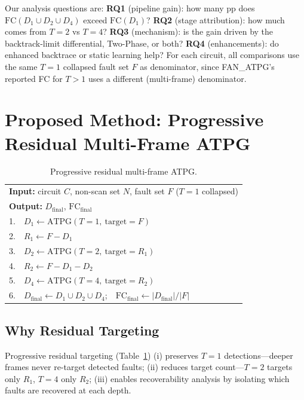 \documentclass[conference]{IEEEtran}
\begin{document}
Our analysis questions are: \textbf{RQ1} (pipeline gain): how many pp does
$\mathrm{FC}(D_1{\cup}D_2{\cup}D_4)$ exceed $\mathrm{FC}(D_1)$? \textbf{RQ2}
(stage attribution): how much comes from $T{=}2$ vs $T{=}4$? \textbf{RQ3}
(mechanism): is the gain driven by the backtrack-limit differential, Two-Phase, or both?
\textbf{RQ4} (enhancements): do enhanced backtrace or static learning help? For
each circuit, all comparisons use the same $T{=}1$ collapsed fault set $F$ as
denominator, since FAN\_ATPG's reported FC for $T{>}1$ uses a different
(multi-frame) denominator.

\section{Proposed Method: Progressive Residual Multi-Frame ATPG}
\label{sec:method}

\begin{table}[t]
\caption{Progressive residual multi-frame ATPG.}
\label{tab:algo}
\centering
\footnotesize
\begin{tabular}{@{}l@{}}
\toprule
\textbf{Input:} circuit $C$, non-scan set $N$, fault set $F$ ($T{=}1$ collapsed)\\
\textbf{Output:} $D_{\text{final}}$, $\mathrm{FC}_{\text{final}}$\\
\midrule
1.\ \ $D_1 \leftarrow \mathrm{ATPG}(T{=}1,\ \text{target}{=}F)$\\
2.\ \ $R_1 \leftarrow F - D_1$\\
3.\ \ $D_2 \leftarrow \mathrm{ATPG}(T{=}2,\ \text{target}{=}R_1)$\\
4.\ \ $R_2 \leftarrow F - D_1 - D_2$\\
5.\ \ $D_4 \leftarrow \mathrm{ATPG}(T{=}4,\ \text{target}{=}R_2)$\\
6.\ \ $D_{\text{final}} \leftarrow D_1 \cup D_2 \cup D_4$;\ \
$\mathrm{FC}_{\text{final}} \leftarrow |D_{\text{final}}|/|F|$\\
\bottomrule
\end{tabular}
\end{table}

\subsection{Why Residual Targeting}
Progressive residual targeting (Table~\ref{tab:algo}) (i) preserves $T{=}1$
detections---deeper frames never re-target detected faults; (ii) reduces target
count---$T{=}2$ targets only $R_1$, $T{=}4$ only $R_2$; (iii) enables
recoverability analysis by isolating which faults are recovered at each depth.
\end{document}
